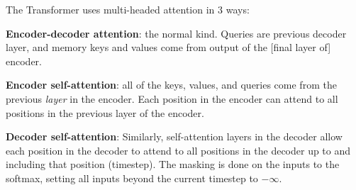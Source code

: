 \documentclass[11pt]{article}
\begin{document}
The Transformer uses multi-headed attention in 3 ways:
\begin{compactenum}
	\item \textbf{Encoder-decoder attention}: the normal kind. Queries are previous decoder layer, and memory keys and values come from output of the [final layer of] encoder. 
	
	\item \textbf{Encoder self-attention}: all of the keys, values, and queries come from the previous \textit{layer} in the encoder. Each position in the encoder can attend to all positions in the previous layer of the encoder. 
	
	\item \textbf{Decoder self-attention}: Similarly, self-attention layers in the decoder allow each position in the decoder to attend to all positions in the decoder up to and including that position (timestep). The masking is done on the inputs to the softmax, setting all inputs beyond the current timestep to $-\infty$. 
\end{compactenum}
\end{document}
